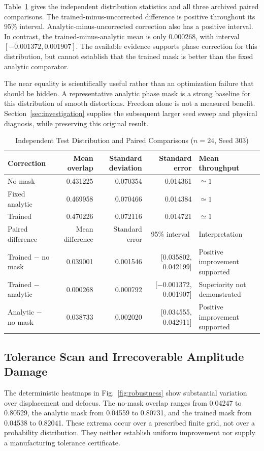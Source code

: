 \documentclass[journal]{IEEEtran}
\begin{document}
Table~\ref{tab:paired} gives the independent distribution statistics and all three archived paired comparisons. The trained-minus-uncorrected difference is positive throughout its 95\% interval. Analytic-minus-uncorrected correction also has a positive interval. In contrast, the trained-minus-analytic mean is only 0.000268, with interval $[-0.001372,0.001907]$. The available evidence supports phase correction for this distribution, but cannot establish that the trained mask is better than the fixed analytic comparator.

The near equality is scientifically useful rather than an optimization failure that should be hidden. A representative analytic phase mask is a strong baseline for this distribution of smooth distortions. Freedom alone is not a measured benefit. Section~\ref{sec:investigation} supplies the subsequent larger seed sweep and physical diagnosis, while preserving this original result.

\begin{table}[!t]
\caption{Independent Test Distribution and Paired Comparisons ($n=24$, Seed 303)}
\label{tab:paired}
\centering\small
\begin{tabular}{lrrrl}
\toprule
Correction & Mean overlap & Standard deviation & Standard error & Mean throughput\\
\midrule
No mask & 0.431225 & 0.070354 & 0.014361 & $\simeq1$\\
Fixed analytic & 0.469958 & 0.070466 & 0.014384 & $\simeq1$\\
Trained & 0.470226 & 0.072116 & 0.014721 & $\simeq1$\\
\midrule
Paired difference & Mean difference & Standard error & \multicolumn{1}{c}{95\% interval} & Interpretation\\
\midrule
Trained $-$ no mask & 0.039001 & 0.001546 & [0.035802, 0.042199] & Positive improvement supported\\
Trained $-$ analytic & 0.000268 & 0.000792 & [$-0.001372$, 0.001907] & Superiority not demonstrated\\
Analytic $-$ no mask & 0.038733 & 0.002020 & [0.034555, 0.042911] & Positive improvement supported\\
\bottomrule
\end{tabular}
\end{table}

\subsection{Tolerance Scan and Irrecoverable Amplitude Damage}
The deterministic heatmaps in Fig.~\ref{fig:robustness} show substantial variation over displacement and defocus. The no-mask overlap ranges from 0.04247 to 0.80529, the analytic mask from 0.04559 to 0.80731, and the trained mask from 0.04538 to 0.82041. These extrema occur over a prescribed finite grid, not over a probability distribution. They neither establish uniform improvement nor supply a manufacturing tolerance certificate.
\end{document}
